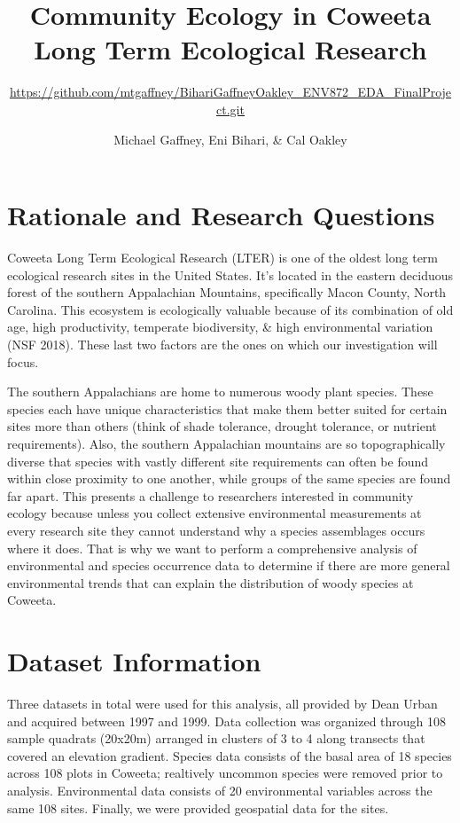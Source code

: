 \documentclass[
  12pt,
]{article}
\title{Community Ecology in Coweeta Long Term Ecological Research}
\subtitle{\url{https://github.com/mtgaffney/BihariGaffneyOakley_ENV872_EDA_FinalProject.git}}
\author{Michael Gaffney, Eni Bihari, \& Cal Oakley}
\date{}
\begin{document}
\maketitle

\newpage
\tableofcontents 
\newpage
\listoffigures 
\newpage

\hypertarget{rationale-and-research-questions}{%
\section{Rationale and Research
Questions}\label{rationale-and-research-questions}}

Coweeta Long Term Ecological Research (LTER) is one of the oldest long
term ecological research sites in the United States. It's located in the
eastern deciduous forest of the southern Appalachian Mountains,
specifically Macon County, North Carolina. This ecosystem is
ecologically valuable because of its combination of old age, high
productivity, temperate biodiversity, \& high environmental variation
(NSF 2018). These last two factors are the ones on which our
investigation will focus.

The southern Appalachians are home to numerous woody plant species.
These species each have unique characteristics that make them better
suited for certain sites more than others (think of shade tolerance,
drought tolerance, or nutrient requirements). Also, the southern
Appalachian mountains are so topographically diverse that species with
vastly different site requirements can often be found within close
proximity to one another, while groups of the same species are found far
apart. This presents a challenge to researchers interested in community
ecology because unless you collect extensive environmental measurements
at every research site they cannot understand why a species assemblages
occurs where it does. That is why we want to perform a comprehensive
analysis of environmental and species occurrence data to determine if
there are more general environmental trends that can explain the
distribution of woody species at Coweeta.

\newpage

\hypertarget{dataset-information}{%
\section{Dataset Information}\label{dataset-information}}

Three datasets in total were used for this analysis, all provided by
Dean Urban and acquired between 1997 and 1999. Data collection was
organized through 108 sample quadrats (20x20m) arranged in clusters of 3
to 4 along transects that covered an elevation gradient. Species data
consists of the basal area of 18 species across 108 plots in Coweeta;
realtively uncommon species were removed prior to analysis.
Environmental data consists of 20 environmental variables across the
same 108 sites. Finally, we were provided geospatial data for the sites.
\end{document}
